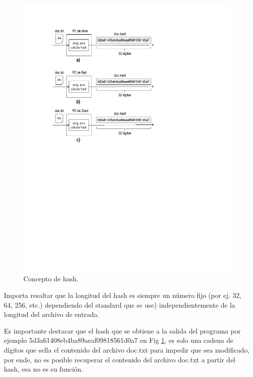 \documentclass[12pt]{report} %
\begin{document}
\begin{figure}
\centering
\includegraphics[width=0.85\columnwidth]{imagenes/imagenfirma1.pdf}
\caption{Concepto de hash.}
\label{imagenfirma1}
\end{figure} 

Importa resaltar que la longitud del hash es siempre un número fijo (por ej. 32, 64, 256, etc.) dependiendo del standard que se use) independientemente de la longitud del archivo de entrada. 

Es importante destacar que el hash que se obtiene a la salida del programa por ejemplo 5d3a61408eb4ba89aeaf09818561d0a7 en Fig \ref{imagenfirma1}, es solo una cadena de dígitos que sella el contenido del archivo doc.txt para impedir que sea modificado, por ende, no es posible recuperar el contenido del archivo doc.txt a partir del hash, esa no es su función.
\end{document}
